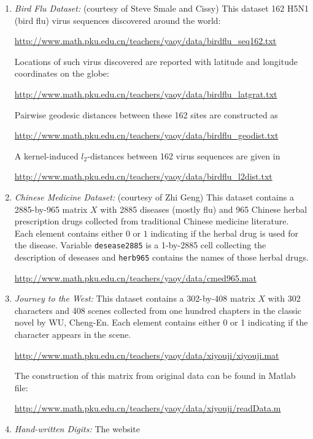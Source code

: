 \documentclass[11pt]{article}
\begin{document}
\begin{enumerate}

\item {\em Bird Flu Dataset:} (courtesy of Steve Smale and Cissy) This dataset 162 H5N1 (bird flu) virus sequences discovered around the world:

\url{http://www.math.pku.edu.cn/teachers/yaoy/data/birdflu_seq162.txt} 

Locations of such virus discovered are reported with latitude and longitude coordinates on the globe:

\url{http://www.math.pku.edu.cn/teachers/yaoy/data/birdflu_latgrat.txt} 

Pairwise geodesic distances between these 162 sites are constructed as  

\url{http://www.math.pku.edu.cn/teachers/yaoy/data/birdflu_geodist.txt}

A kernel-induced $l_2$-distances between 162 virus sequences are given in 

\url{http://www.math.pku.edu.cn/teachers/yaoy/data/birdflu_l2dist.txt}

\item {\em Chinese Medicine Dataset:} (courtesy of Zhi Geng) This dataset contains a 2885-by-965 matrix $X$ with 2885 diseases (mostly flu) and 965 Chinese herbal prescription drugs collected from traditional Chinese medicine literature. Each element contains either $0$ or $1$ indicating if the herbal drug is used for the disease. Variable {\tt{desease2885}} is a 1-by-2885 cell collecting the description of deseases and {\tt{herb965}} contains the names of those herbal drugs. 

\url{http://www.math.pku.edu.cn/teachers/yaoy/data/cmed965.mat} 

\item {\em Journey to the West:} This dataset contains a 302-by-408 matrix $X$ with 302 characters and 408 scenes collected from one hundred chapters in
the classic novel by WU, Cheng-En. Each element contains either 0 or 1 indicating if the character appears in the scene. 

\url{http://www.math.pku.edu.cn/teachers/yaoy/data/xiyouji/xiyouji.mat} 

The construction of this matrix from original data can be found in Matlab file: 

\url{http://www.math.pku.edu.cn/teachers/yaoy/data/xiyouji/readData.m}

\item {\em Hand-written Digits:} The website 


\end{enumerate}
\end{document}
